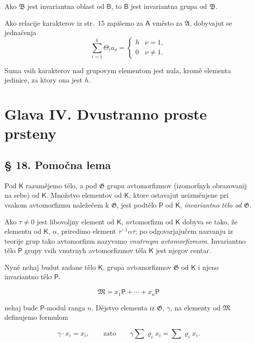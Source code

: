\documentclass[11pt]{article}
\begin{document}
Ako \(\mathfrak B\) jest invariantna oblast od \(\mathsf B\), to \(\mathsf B\) jest invariantna grupa od \(\mathfrak B\).

Ako relacije karakterov iz str.~15 zapišemo za \(\mathsf A\) vměsto za \(\mathfrak A\), dobyvajut se jednačenja
\[
\sum_{i=1}^{h} \Theta_i a_\nu =
\begin{cases}
h & \nu=1,\\
0 & \nu\ne 1.
\end{cases}
\]

Suma vsih karakterov nad grupovym elementom jest nula, kromě elementa jedinice, za ktory ona jest \(h\).

\section*{Glava IV. Dvustranno proste prsteny}\label{kapitel-iv.-zweiseitig-einfache-ringe}

\subsection*{§ 18. Pomočna lema}\label{ein-hilfssatz}

Pod \(\mathsf K\) razumějemo tělo, a pod \(\mathfrak G\) grupu avtomorfizmov (izomorfnyh obrazovanij na sebe) od \(\mathsf K\). Množstvo elementov od \(\mathsf K\), ktore ostavajut neizměnjene pri vsakom avtomorfizmu naležečem k \(\mathfrak G\), jest podtělo \(\mathsf P\) od \(\mathsf K\), \emph{invariantno tělo od} \(\mathfrak G\).

Ako \(\tau\ne 0\) jest libovoljny element od \(\mathsf K\), avtomorfizm od \(\mathsf K\) dobyva se tako, že elementu od \(\mathsf K\), \(\alpha\), priredimo element \(\tau^{-1}\alpha\tau\); po odgovarjajučem nazvanju iz teorije grup tako avtomorfizm nazyvamo \emph{vnutrnym avtomorfizmom}. Invariantno tělo \(\mathsf P\) grupy vsih vnutrnyh avtomorfizmov těla \(\mathsf K\) jest njegov centar.

Nyně nehaj budut zadane tělo \(\mathsf K\), grupa avtomorfizmov \(\mathfrak G\) od \(\mathsf K\) i njeno invariantno tělo \(\mathsf P\).

\[
\mathfrak M=x_1\mathsf P+\cdots+x_n\mathsf P
\]

nehaj bude \(\mathsf P\)-modul ranga \(n\). Dějstvo elementa iz \(\mathfrak G\), \(\gamma\), na elementy od \(\mathfrak M\) definujemo formulom

\[
\gamma\cdot x_i=x_i,\qquad\text{zato}\qquad
\gamma\sum \varrho_i x_i=\sum \varrho_i x_i.
\]
\end{document}
